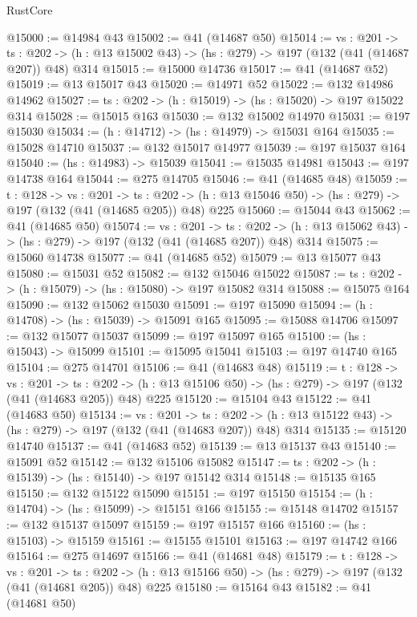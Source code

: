 \begin{lexlean}{RustCore}
\begin{coremodule}
@15000 := @14984 @43
@15002 := @41 (@14687 @50)
@15014 := {vs : @201} ->
  {ts : @202} -> (h : @13 @15002 @43) -> (hs : @279) -> @197 (@132 (@41 (@14687 @207)) @48) @314
@15015 := @15000 @14736
@15017 := @41 (@14687 @52)
@15019 := @13 @15017 @43
@15020 := @14971 @52
@15022 := @132 @14986 @14962
@15027 := {ts : @202} -> (h : @15019) -> (hs : @15020) -> @197 @15022 @314
@15028 := @15015 @163
@15030 := @132 @15002 @14970
@15031 := @197 @15030
@15034 := (h : @14712) -> (hs : @14979) -> @15031 @164
@15035 := @15028 @14710
@15037 := @132 @15017 @14977
@15039 := @197 @15037 @164
@15040 := (hs : @14983) -> @15039
@15041 := @15035 @14981
@15043 := @197 @14738 @164
@15044 := @275 @14705
@15046 := @41 (@14685 @48)
@15059 := {t : @128} ->
  {vs : @201} ->
  {ts : @202} -> (h : @13 @15046 @50) -> (hs : @279) -> @197 (@132 (@41 (@14685 @205)) @48) @225
@15060 := @15044 @43
@15062 := @41 (@14685 @50)
@15074 := {vs : @201} ->
  {ts : @202} -> (h : @13 @15062 @43) -> (hs : @279) -> @197 (@132 (@41 (@14685 @207)) @48) @314
@15075 := @15060 @14738
@15077 := @41 (@14685 @52)
@15079 := @13 @15077 @43
@15080 := @15031 @52
@15082 := @132 @15046 @15022
@15087 := {ts : @202} -> (h : @15079) -> (hs : @15080) -> @197 @15082 @314
@15088 := @15075 @164
@15090 := @132 @15062 @15030
@15091 := @197 @15090
@15094 := (h : @14708) -> (hs : @15039) -> @15091 @165
@15095 := @15088 @14706
@15097 := @132 @15077 @15037
@15099 := @197 @15097 @165
@15100 := (hs : @15043) -> @15099
@15101 := @15095 @15041
@15103 := @197 @14740 @165
@15104 := @275 @14701
@15106 := @41 (@14683 @48)
@15119 := {t : @128} ->
  {vs : @201} ->
  {ts : @202} -> (h : @13 @15106 @50) -> (hs : @279) -> @197 (@132 (@41 (@14683 @205)) @48) @225
@15120 := @15104 @43
@15122 := @41 (@14683 @50)
@15134 := {vs : @201} ->
  {ts : @202} -> (h : @13 @15122 @43) -> (hs : @279) -> @197 (@132 (@41 (@14683 @207)) @48) @314
@15135 := @15120 @14740
@15137 := @41 (@14683 @52)
@15139 := @13 @15137 @43
@15140 := @15091 @52
@15142 := @132 @15106 @15082
@15147 := {ts : @202} -> (h : @15139) -> (hs : @15140) -> @197 @15142 @314
@15148 := @15135 @165
@15150 := @132 @15122 @15090
@15151 := @197 @15150
@15154 := (h : @14704) -> (hs : @15099) -> @15151 @166
@15155 := @15148 @14702
@15157 := @132 @15137 @15097
@15159 := @197 @15157 @166
@15160 := (hs : @15103) -> @15159
@15161 := @15155 @15101
@15163 := @197 @14742 @166
@15164 := @275 @14697
@15166 := @41 (@14681 @48)
@15179 := {t : @128} ->
  {vs : @201} ->
  {ts : @202} -> (h : @13 @15166 @50) -> (hs : @279) -> @197 (@132 (@41 (@14681 @205)) @48) @225
@15180 := @15164 @43
@15182 := @41 (@14681 @50)

\end{coremodule}
\end{lexlean}
